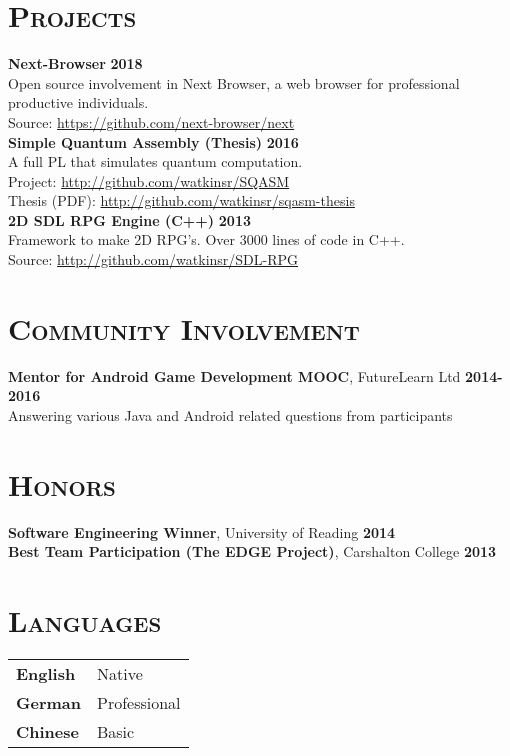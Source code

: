 \documentclass[line, margin, 10pt]{res}
\begin{document}
\begin{resume}
\newpage
\section{\textsc{Projects}}

{\bf Next-Browser} {\bf \hfill 2018}\\
Open source involvement in Next Browser, a web browser for professional productive individuals.\\
Source: \url{https://github.com/next-browser/next}\\

{\bf Simple Quantum Assembly (Thesis)} {\bf \hfill 2016}\\
A full PL that simulates quantum computation.\\
Project: \url{http://github.com/watkinsr/SQASM}\\
Thesis (PDF): \url{http://github.com/watkinsr/sqasm-thesis}\\

{\bf 2D SDL RPG Engine (C++)} {\bf \hfill 2013}\\
Framework to make 2D RPG's. Over 3000 lines of code in C++.  \\
Source: \url{http://github.com/watkinsr/SDL-RPG}


\section{\textsc{Community Involvement}}

{\bf Mentor for Android Game Development MOOC}, FutureLearn Ltd {\bf \hfill 2014-2016}\\
Answering various Java and Android related questions from participants

\section{\textsc{Honors}}

{\bf Software Engineering Winner}, University of Reading {\bf \hfill 2014}\\
{\bf Best Team Participation (The EDGE Project)}, Carshalton College {\bf \hfill 2013}

\section{\textsc{Languages}}

\begin{tabular}[t]{@{} p{1.2in} p{3.75in} @{}}

\textbf{English} & Native\\ 
\textbf{German} & Professional\\ 
\textbf{Chinese} & Basic

\end{tabular}

\end{resume}
\end{document}
